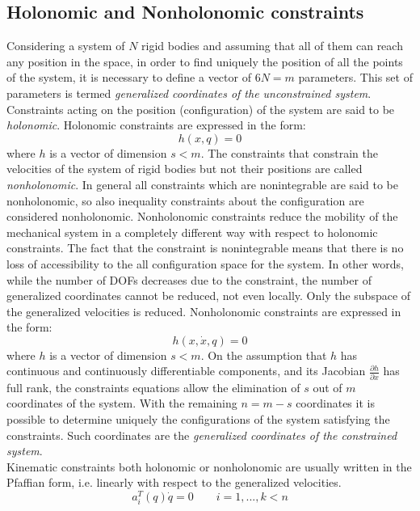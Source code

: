 \subsection{Holonomic and Nonholonomic constraints}
Considering a system of $N$ rigid bodies and assuming that all of them can reach any position in the space, in order to find uniquely the position of all the points of the system, it is necessary to define a vector of $6N = m$ parameters. This set of parameters is termed \textit{ generalized coordinates of the unconstrained system}. 
Constraints acting on the position (configuration) of the system are said to be  \textit{holonomic}. 
Holonomic constraints are expressed in the form:
\begin{equation}
h\left( x,q \right) =0
\end{equation}
where $h$ is a vector of dimension $s<m$.
The constraints that constrain the velocities of the system of rigid bodies but not their positions are called \textit{nonholonomic}. In general all constraints which are nonintegrable are said to be nonholonomic, so also inequality constraints about the configuration are considered nonholonomic. 
Nonholonomic constraints reduce the mobility of the mechanical system in a completely different way with respect to holonomic constraints. The fact that the constraint is nonintegrable means that there is no loss of accessibility to the all configuration space for the system. In other words, while the number of DOFs decreases due to the constraint, the number of generalized coordinates cannot be reduced, not even locally. Only the subspace of the generalized velocities is reduced.
Nonholonomic constraints are expressed in the form:
\begin{equation}
h( x,\dot{x},q) =0
\end{equation}
where $h$ is a vector of dimension $s<m$.
On the assumption that $h$ has continuous and continuously differentiable components, and its Jacobian $ \frac{\partial h}{\partial x} $ has full rank, the constraints equations allow the elimination of $s$ out of $m$ coordinates of the system. With the remaining $ n = m - s $ coordinates it is possible to determine uniquely the configurations of the system satisfying the constraints. Such coordinates are the \textit{generalized coordinates of the constrained system}.\\
Kinematic constraints both holonomic or nonholonomic are usually written in the Pfaffian form, i.e. linearly with respect to the generalized velocities.
\begin{equation}
	a_i^T \left( q \right)\dot{q} =0 \qquad i=1,...,k<n 
\end{equation}

